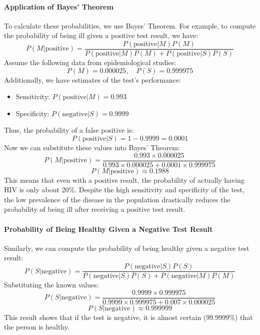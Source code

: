     \paragraph{Application of Bayes' Theorem}
    To calculate these probabilities, we use Bayes' Theorem. For example, to compute the probability of being ill given a positive test result, we have:
    \[
    P(M | \text{positive}) = \frac{P(\text{positive} | M) P(M)}{P(\text{positive} | M) P(M) + P(\text{positive} | S) P(S)}
    \]
    Assume the following data from epidemiological studies:
    \[
    P(M) = 0.000025, \quad P(S) = 0.999975
    \]
    Additionally, we have estimates of the test's performance:
    \begin{itemize}
        \item Sensitivity: \( P(\text{positive} | M) = 0.993 \)
        \item Specificity: \( P(\text{negative} | S) = 0.9999 \)
    \end{itemize}
    Thus, the probability of a false positive is:
    \[
    P(\text{positive} | S) = 1 - 0.9999 = 0.0001
    \]
    Now we can substitute these values into Bayes' Theorem:
    \[
    P(M | \text{positive}) = \frac{0.993 \times 0.000025}{0.993 \times 0.000025 + 0.0001 \times 0.999975}
    \]
    \[
    P(M | \text{positive}) \approx 0.1988
    \]
    This means that even with a positive result, the probability of actually having HIV is only about 20\%. Despite the high sensitivity and specificity of the test, the low prevalence of the disease in the population drastically reduces the probability of being ill after receiving a positive test result.
    
    \paragraph{Probability of Being Healthy Given a Negative Test Result}
    Similarly, we can compute the probability of being healthy given a negative test result:
    \[
    P(S | \text{negative}) = \frac{P(\text{negative} | S) P(S)}{P(\text{negative} | S) P(S) + P(\text{negative} | M) P(M)}
    \]
    Substituting the known values:
    \[
    P(S | \text{negative}) = \frac{0.9999 \times 0.999975}{0.9999 \times 0.999975 + 0.007 \times 0.000025}
    \]
    \[
    P(S | \text{negative}) \approx 0.999999
    \]
    This result shows that if the test is negative, it is almost certain (99.9999\%) that the person is healthy.
    
